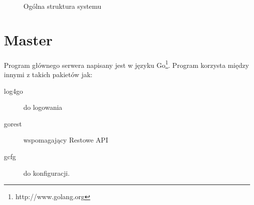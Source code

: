 \documentclass[paper=a4, fontsize=11pt]{scrartcl} %
\numberwithin{equation}{section} %
\numberwithin{figure}{section} %
\numberwithin{table}{section} %
\begin{document}
\begin{figure}[t]
	\begin{center}
		\caption{Ogólna struktura systemu}
	\end{center}
\end{figure}
\clearpage

\section{Master}
	Program głównego serwera napisany jest w języku Go\footnote{http://www.golang.org}. 
	Program korzysta między innymi z takich pakietów jak:
	\begin{description}
		 \item[log4go] do logowania
		 \item[gorest] wspomagający Restowe API 
		 \item[gcfg] do konfiguracji.
	\end{description}		
	
\end{document}
